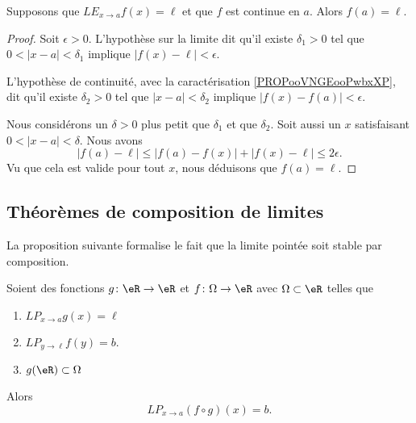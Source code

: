 \begin{lemma}     \label{LEMooNEGOooCllIMN}
	Supposons que \( {LE}_{x\to a}f(x)=\ell\) et que \( f\) est continue en \( a\). Alors \( f(a)=\ell\).
\end{lemma}

\begin{proof}
	Soit \( \epsilon>0\). L'hypothèse sur la limite dit qu'il existe \( \delta_1>0\) tel que \( 0<| x-a |<\delta_1\) implique \( | f(x)-\ell |<\epsilon\).

	L'hypothèse de continuité, avec la caractérisation \ref{PROPooVNGEooPwbxXP}, dit qu'il existe \( \delta_2>0\) tel que \( | x-a |<\delta_2\) implique \( | f(x)-f(a) |<\epsilon\).

	Nous considérons un \( \delta>0\) plus petit que \( \delta_1\) et que \( \delta_2\). Soit aussi un \( x\) satisfaisant \( 0<| x-a |<\delta\). Nous avons
	\begin{equation}
		| f(a)-\ell |\leq| f(a)-f(x) |+| f(x)-\ell |\leq 2\epsilon.
	\end{equation}
	Vu que cela est valide pour tout \( x\), nous déduisons que \( f(a)=\ell\).
\end{proof}

\subsection{Théorèmes de composition de limites}

La proposition suivante formalise le fait que la limite pointée soit stable par composition.
\begin{theorem}     \label{THOooOYXDooKDPkuW}
	Soient des fonctions \( g\colon \eR\to \eR\) et \( f\colon \Omega\to \eR\) avec \( \Omega\subset \eR\) telles que
	\begin{enumerate}
		\item
		      \( {LP}_{x\to a}g(x)=\ell\)
		\item
		      \( {LP}_{y\to \ell}f(y)=b\).
		\item
		      \( g(\eR)\subset \Omega\)
	\end{enumerate}
	Alors
	\begin{equation}
		{LP}_{x\to a} (f\circ g)(x)=b.
	\end{equation}
\end{theorem}

